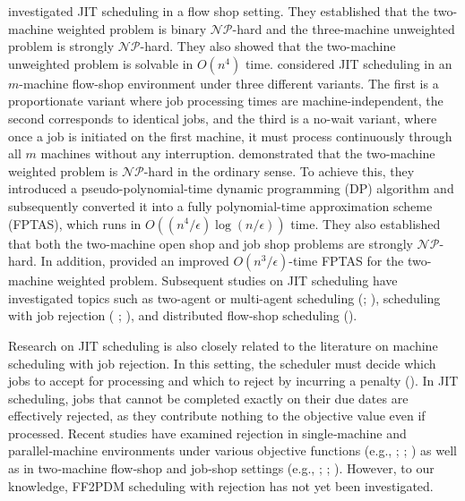 \documentclass[12pt, eqno, limlimits]{article}
\begin{document}
\begin{sloppypar}
        \cite{ChoiYoon2007JOS} investigated JIT scheduling in a flow shop setting. They established that the two-machine weighted problem is binary $\mathcal{NP}$-hard and the three-machine unweighted problem is strongly $\mathcal{NP}$-hard. They also showed that the two-machine unweighted problem is solvable in $O(n^4)$ time. \cite{Shabtay2012EJOR} considered JIT scheduling in an $m$-machine flow-shop environment under three different variants. The first is a proportionate variant where job processing times are machine-independent, the second corresponds to identical jobs, and the third is a no-wait variant, where once a job is initiated on the first machine, it must process continuously through all $m$ machines without any interruption. \cite{ShabtayBensoussan2012JOS} demonstrated that the two-machine weighted problem is $\mathcal{NP}$-hard in the ordinary sense. To achieve this, they introduced a pseudo-polynomial-time dynamic programming (DP) algorithm and subsequently converted it into a fully polynomial-time approximation scheme (FPTAS), which runs in $O((n^4/\epsilon) \log(n/\epsilon))$ time. They also established that both the two-machine open shop and job shop problems are strongly $\mathcal{NP}$-hard. In addition, \cite{Elalouf2013JOS} provided an improved $O(n^3/\epsilon)$-time FPTAS for the two-machine weighted problem. Subsequent studies on JIT scheduling have investigated topics such as two-agent or multi-agent scheduling (\citealp{Yin2017JOS}; \citealp{Chen2019EngineeringOptimization}), scheduling with job rejection ( \citealp{MorMosheiov2022OperationalResearch}; \citealp{AtsmonyMosheiov2023JOS}), and distributed flow-shop scheduling (\citealp{Shabtay2023NRL}).
        
        Research on JIT scheduling is also closely related to the literature on machine scheduling with job rejection. In this setting, the scheduler must decide which jobs to accept for processing and which to reject by incurring a penalty (\citealp{ShabtayGasparKaspi2013JOS}). In JIT scheduling, jobs that cannot be completed exactly on their due dates are effectively rejected, as they contribute nothing to the objective value even if processed. Recent studies have examined rejection in single‑machine and parallel‑machine environments under various objective functions (e.g., \citealp{AtsmonyMosheiov2023JOS}; \citealp{LuOuYuZhang2023NRL}; \citealp{SangYW2025NRL}) as well as in two‑machine flow‑shop and job‑shop settings (e.g., \citealp{KimLee2022COR}; \citealp{ChenLi2024OPT}; \citealp{ShabtayGerstl2024EJOR}). However, to our knowledge, FF2PDM scheduling with rejection has not yet been investigated.
        

\end{sloppypar}
\end{document}
